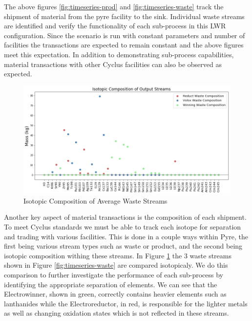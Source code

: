 The above figures \ref{fig:timeseries-prod} and \ref{fig:timeseries-waste} track the shipment of material from the pyre facility to the sink.
Individual waste streams are identified and verify the functionality of each sub-process in this LWR configuration. Since the scenario is run with
constant parameters and number of facilities the transactions are expected to remain constant and the above figures meet this expectation.
In addition to demonstrating sub-process capabilities, material transactions with other Cyclus facilities can also be observed as expected.


\begin{figure}
	\centering
	\includegraphics[width=\linewidth]{images/avg-isotope-comp}
	\caption{Isotopic Composition of Average Waste Streams}
	\label{fig:avg-isotope-comp}
\end{figure}

Another key aspect of material transactions is the composition of each shipment. To meet Cyclus standards we must be able to track each isotope for
separation and trading with various facilities. This is done in a couple ways within Pyre, the first being various stream types such as waste or product,
and the second being isotopic composition withing these streams. In Figure \ref{fig:avg-isotope-comp} the 3 waste streams shown in Figure \ref{fig:timeseries-waste}
are compared isotopicaly. We do this comparison to further investigate the performance of each sub-process by identifying the appropriate separation of elements.
We can see that the Electrowinner, shown in green, correctly contains heavier elements such as lanthanides while the Electroreductor, in red, is responsible for the lighter metals
as well as changing oxidation states which is not reflected in these streams.

